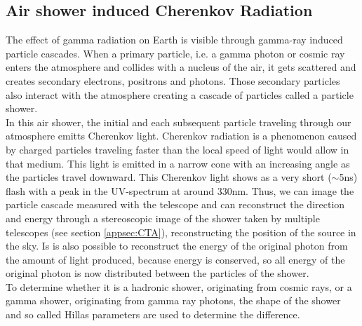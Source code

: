 \documentclass[12pt,article,type=msc,colorback,accentcolor=tud9c]{tudthesis}
\begin{document}
\subsection{Air shower induced Cherenkov Radiation}

\begin{wrapfigure}{R}{0.4\textwidth}
\centering
\texttt{[image: D:/OwnCloudData/00\_WriteUP/04\_Thesis/Pic/Proposal/Fig/\{gamma]}.jpg}
\caption[Cherenkov light cone]{\label{fig:Cherenkov} The cone of Cherenkov light emitted by an extensive air shower. Picture from \cite{AsperaCTA}}
\end{wrapfigure}

The effect of gamma radiation on Earth is visible through gamma-ray induced particle cascades. When a primary particle, i.e. a gamma photon or cosmic ray enters the atmosphere and collides with a nucleus of the air, it gets scattered and creates secondary electrons, positrons and photons. Those secondary particles also interact with the atmosphere creating a cascade of particles called a particle shower.\\
In this air shower, the initial and each subsequent particle traveling through our atmosphere emitts Cherenkov light. Cherenkov radiation is a phenomenon caused by charged particles traveling faster than the local speed of light would allow in that medium. This light is emitted in a narrow cone with an increasing angle as the particles travel downward. This Cherenkov light shows as a very short ($\sim$5ns) flash with a peak in the UV-spectrum at around 330nm.
Thus, we can image the particle cascade measured with the telescope and can reconstruct the direction and energy through a stereoscopic image of the shower taken by multiple telescopes (see section {\ref{appsec:CTA}}), reconstructing the position of the source in the sky. Is is also possible to reconstruct the energy of the original photon from the amount of light produced, because energy is conserved, so all energy of the original photon is now distributed between the particles of the shower.\\
To determine whether it is a hadronic shower, originating from cosmic rays, or a gamma shower, originating from gamma ray photons, the shape of the shower and so called Hillas parameters are used to determine the difference.
\end{document}
